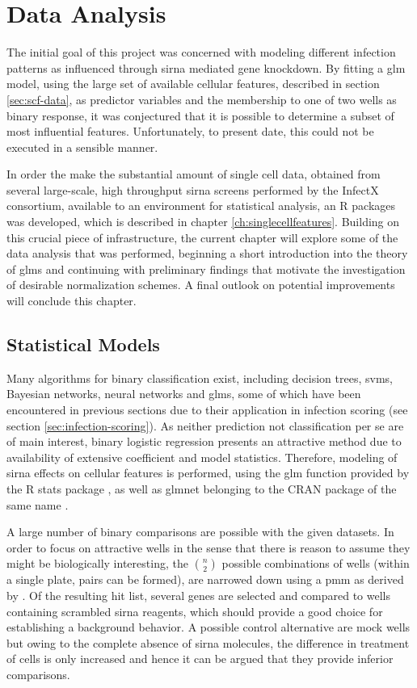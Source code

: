 \chapter{Data Analysis}
\label{ch:data-analysis}

The initial goal of this project was concerned with modeling different infection patterns as influenced through \gls{sirna} mediated gene knockdown. By fitting a \gls{glm} model, using the large set of available cellular features, described in section \ref{sec:scf-data}, as predictor variables and the membership to one of two wells as binary response, it was conjectured that it is possible to determine a subset of most influential features. Unfortunately, to present date, this could not be executed in a sensible manner.

In order the make the substantial amount of single cell data, obtained from several large-scale, high throughput \gls{sirna} screens performed by the InfectX consortium, available to an environment for statistical analysis, an R packages was developed, which is described in chapter \ref{ch:singlecellfeatures}. Building on this crucial piece of infrastructure, the current chapter will explore some of the data analysis that was performed, beginning a short introduction into the theory of \glspl{glm} and continuing with preliminary findings that motivate the investigation of desirable normalization schemes. A final outlook on potential improvements will conclude this chapter.

\section{Statistical Models}
Many algorithms for binary classification exist, including decision trees, \glspl{svm}, Bayesian networks, neural networks and \glspl{glm}, some of which have been encountered in previous sections due to their application in infection scoring (see section \ref{sec:infection-scoring}). As neither prediction not classification per se are of main interest, binary logistic regression presents an attractive method due to availability of extensive coefficient and model statistics. Therefore, modeling of \gls{sirna} effects on cellular features is performed, using the glm function provided by the R stats package \citep{RCoreTeam2015}, as well as glmnet belonging to the CRAN package of the same name \citep{Friedman2010a}.

A large number of binary comparisons are possible with the given datasets. In order to focus on attractive wells in the sense that there is reason to assume they might be biologically interesting, the $n \choose 2$ possible combinations of wells (within a single plate,  pairs can be formed), are narrowed down using a \gls{pmm} as derived by \cite{Ramo2014}. Of the resulting hit list, several genes are selected and compared to wells containing scrambled \gls{sirna} reagents, which should provide a good choice for establishing a background behavior. A possible control alternative are mock wells but owing to the complete absence of \gls{sirna} molecules, the difference in treatment of cells is only increased and hence it can be argued that they provide inferior comparisons.

